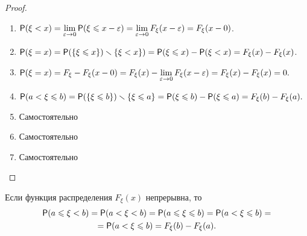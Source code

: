 \begin{proof}
	\begin{enumerate}
		\item $\P(\xi<x)=\lim\limits_{\varepsilon\to 0} \P(\xi\leqslant x-\varepsilon)=
		\lim\limits_{\varepsilon\to 0} F_{\xi}(x-\varepsilon)=F_{\xi}(x-0)$.

		\item $\P(\xi=x)=\P(\{\xi\leqslant x\})\ssm\{\xi<x \})=\P(\xi\leqslant x)-\P(\xi<x)=F_{\xi}(x)-F_{\xi}(x)$.

		\item $\P(\xi=x)=F_{\xi}-F_{\xi}(x-0)=F_{\xi}(x)-\lim\limits_{\varepsilon\to 0} F_{\xi}(x-\varepsilon)=F_{\xi}(x)-F_{\xi}(x)=0.$

		\item $\P(a<\xi\leqslant b)= \P(\{\xi\leqslant b \})\ssm \{\xi\leqslant a \}=
		\P(\xi\leqslant b)-\P(\xi\leqslant a)= F_{\xi}(b)-F_{\xi}(a).$

		\item Самостоятельно

		\item Самостоятельно

		\item Самостоятельно
	\end{enumerate}
\end{proof}

\begin{consq}
\label{consq:11.7}
	Если функция распределения $F_{\xi}(x)$ непрерывна, то 
	\begin{gather*}
		\P(a\leqslant \xi<b)=\P(a<\xi<b)=\P(a\leqslant \xi \leqslant b)= \P(a< \xi\leqslant b)= \\ 
		=\P(a<\xi\leqslant b)=F_{\xi}(b)-F_{\xi}(a).
	\end{gather*}
\end{consq}